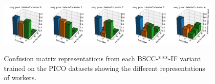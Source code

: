 \begin{figure}
{  \includegraphics[width=1\textwidth, clip=True, trim=0 10 0 27]{figures/worker_models/seq_prev2}
} \\
\caption{Confusion matrix representations from each BSCC-***-IF variant trained on the PICO datasets 
showing the different representations of workers. 
}
\label{fig:conf_mat_clusters}

\end{figure}


%

